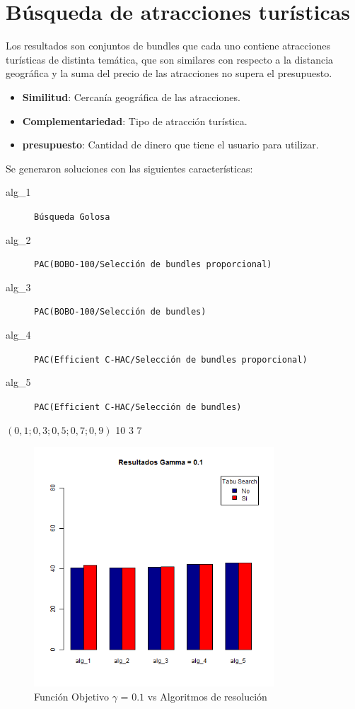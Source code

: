 \section{Búsqueda de atracciones turísticas}\label{res:busAtracciones}
Los resultados son conjuntos de bundles que cada uno contiene atracciones turísticas de distinta temática, que son similares con respecto a la distancia geográfica y la suma del precio de las atracciones no supera el presupuesto.
\begin{itemize}
  \item \textbf{Similitud}: Cercanía geográfica de las atracciones.
  \item \textbf{Complementariedad}: Tipo de atracción turística.
  \item \textbf{presupuesto}: Cantidad de dinero que tiene el usuario para utilizar.
\end{itemize}
Se generaron soluciones con las siguientes características:\\
\SolucionBudget
{}
{
\begin{description}
	\item[alg\_1] \texttt{Búsqueda Golosa}
	\item[alg\_2] \texttt{PAC(BOBO-100/Selección de bundles proporcional)}
	\item[alg\_3] \texttt{PAC(BOBO-100/Selección de bundles)}
	\item[alg\_4] \texttt{PAC(Efficient C-HAC/Selección de bundles proporcional)}
	\item[alg\_5] \texttt{PAC(Efficient C-HAC/Selección de bundles)}
\end{description}
}
{$(0,1; 0,3; 0,5; 0,7; 0,9)$}
{10}
{3}
{7}

\begin{figure}[H]
  \centering
    \includegraphics[width=0.8\textwidth]{resultados/cities/Graficos_agrupados/gamma01-cities.png}
  \caption{Función Objetivo $\gamma$ = $0.1$ vs Algoritmos de resolución}
  \label{res:img-cities-agr-gamma01}
\end{figure}

